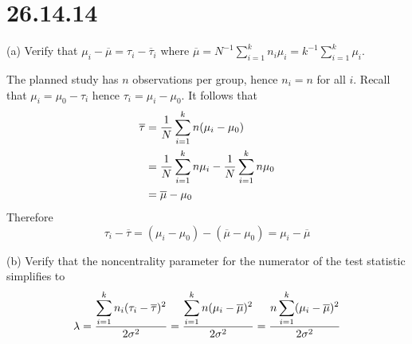 \section*{26.14.14}
(a) Verify that $\mu_i-\overline{\mu}=\tau_i-\overline{\tau}_i$
where $\overline{\mu}=N^{-1}\sum_{i=1}^kn_i\mu_i
=k^{-1}\sum_{i=1}^k\mu_i$.

\bigskip
\noindent
The planned study has $n$ observations
per group, hence $n_i=n$ for all $i$.
Recall that $\mu_i=\mu_0-\tau_i$ hence $\tau_i=\mu_i-\mu_0$.
It follows that
\begin{align*}
\overline{\tau}&={1\over N}\sum_{i=1}^kn(\mu_i-\mu_0)\\
&={1\over N}\sum_{i=1}^kn\mu_i-{1\over N}\sum_{i=1}^kn\mu_0\\
&=\overline{\mu}-\mu_0
\end{align*}
Therefore
\[
\tau_i-\overline{\tau}=(\mu_i-\mu_0)-(\overline{\mu}-\mu_0)
=\mu_i-\overline{\mu}
\]

\bigskip
\noindent
(b) Verify that the noncentrality parameter for the numerator of the
test statistic simplifies to
\[
\lambda
=
{\displaystyle\sum_{i=1}^kn_i(\tau_i-\overline{\tau})^2\over2\sigma^2}
=
{\displaystyle\sum_{i=1}^kn(\mu_i-\overline{\mu})^2\over2\sigma^2}
=
{\displaystyle n\sum_{i=1}^k(\mu_i-\overline{\mu})^2\over2\sigma^2}
\]

